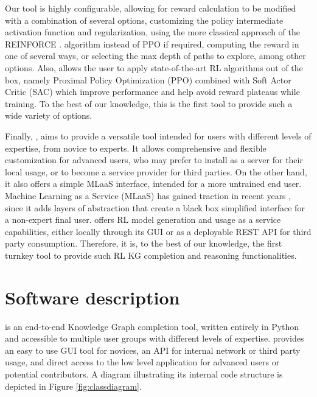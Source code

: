 Our tool is highly configurable, allowing for reward calculation to be modified with a combination of several options, customizing the policy intermediate activation function and regularization, using the more classical approach of the REINFORCE .
algorithm instead of PPO if required, computing the reward in one of several ways, or selecting the max depth of paths to explore, among other options. Also, \toolname{} allows the user to apply state-of-the-art RL algorithms out of the box, namely Proximal Policy Optimization (PPO)
combined with Soft Actor Critic (SAC)
which improve performance and help avoid reward plateaus while training. To the best of our knowledge, this is the first tool to provide such a wide variety of options.

Finally, \toolname{}, aims to provide a versatile tool intended for users with different levels of expertise, from novice to experts. It allows comprehensive and flexible customization for advanced users, who may prefer to install \toolname{} as a server for their local usage, or to become a service provider for third parties. On the other hand, it also offers a simple MLaaS interface, intended for a more untrained end user. Machine Learning as a Service (MLaaS) has gained traction in recent years 
, since it adds layers of abstraction that create a black box simplified interface for a non-expert final user. \toolname{} offers RL model generation and usage as a service capabilities, either locally through its GUI or as a deployable REST API for third party consumption. Therefore, it is, to the best of our knowledge, the first turnkey tool to provide such RL KG completion and reasoning functionalities.

\section{Software description}\label{sec:framework-software}
\toolname{} is an end-to-end Knowledge Graph completion tool, written entirely in Python and accessible to multiple user groups with different levels of expertise. \toolname{} provides an easy to use GUI tool for novices, an API for internal network or third party usage, and direct access to the low level application for advanced users or potential contributors. A diagram illustrating its internal code structure is depicted in Figure \ref{fig:classdiagram}.


